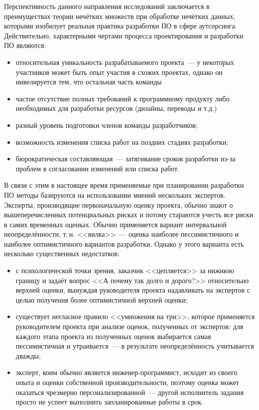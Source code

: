 Перспективность данного направления исследований заключается в преимуществах теории нечётких множеств при обработке нечётких данных, которыми изобилует реальная практика разработки ПО в сфере аутсорсинга. Действительно, характерными чертами процесса проектирования и разработки ПО являются:
\begin{itemize}
  \item относительная уникальность разрабатываемого проекта~--- у некоторых участников может быть опыт участия в схожих проектах, однако он нивелируется тем, что остальная часть команды 
  \item частое отсутствие полных требований к программному продукту либо необходимых для разработки ресурсов (дизайны, переводы и т.д.)
  \item разный уровень подготовки членов команды разработчиков;
  \item возможность изменения списка работ на поздних стадиях разработки;
  \item бюрократическая составляющая~--- затягивание сроков разработки из-за проблем в согласовании изменений или списка работ.
\end{itemize}

В связи с этим в настоящее время применяемые при планировании разработки ПО методы базируются на использовании мнений нескольких экспертов. Эксперты, производящие первоначальную оценку проекта, обычно знают о вышеперечисленных потенциальных рисках и потому стараются учесть все риски в самих временных оценках. Обычно применяется вариант интервальной неопределённости, т.\,н. <<вилка>>~--- оценка наиболее пессимистичного и наиболее оптимистичного вариантов разработки. Однако у этого варианта есть несколько существенных недостатков:
\begin{itemize}
  \item с психологической точки зрения, заказчик <<цепляется>> за нижнюю границу и задаёт вопрос <<А почему так долго и дорого?>> относительно верхней оценки, вынуждая руководителя проекта надавливать на экспертов с целью получения более оптимистичной верхней оценки;
  \item существует негласное правило <<умножения на три>>, которое применяется руководителем проекта при анализе оценок, полученных от экспертов: для каждого этапа проекта из полученных оценок выбирается самая пессимистичная и утраивается~--- в результате неопределённость учитывается дважды; 
  \item эксперт, коим обычно является инженер-программист, исходит из своего опыта и оценки собственной производительности, поэтому оценка может оказаться чрезмерно персонализированной~--- другой исполнитель задания просто не успеет выполнить запланированные работы в срок.
\end{itemize}

